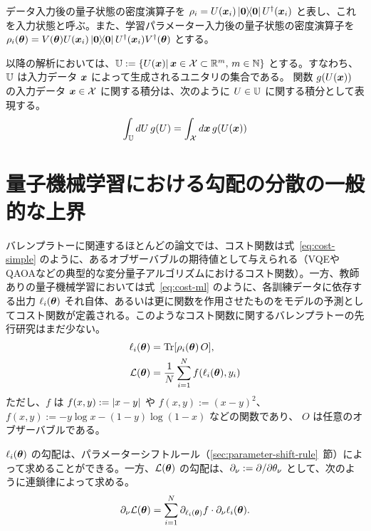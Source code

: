 データ入力後の量子状態の密度演算子を $\rho_i = U(\bs{x}_i)\dyad{\bs{0}}U\dg(\bs{x}_i)$ と表し、これを入力状態と呼ぶ。また、学習パラメーター入力後の量子状態の密度演算子を $\rho_i(\bs{\th}) = V(\bs{\th})U(\bs{x}_i)\dyad{\bs{0}}U\dg(\bs{x}_i)V\dg(\bs{\th})$ とする。

以降の解析においては、$\mathbb{U} := \{U(\boldsymbol{x})|\,\boldsymbol{x}\in \mathcal{X} \subset \mathbb{R}^m,\, m \in \mathbb{N}\}$ とする。すなわち、$\mathbb{U}$ は入力データ $\boldsymbol{x}$ によって生成されるユニタリの集合である。
関数 $g(U(\boldsymbol{x}))$ の入力データ $\boldsymbol{x}\in \mathcal{X}$ に関する積分は、次のように $U\in\mathbb{U}$ に関する積分として表現する。
\begin{align}
    \int_{\mathbb{U}} dU\,g(U) = \int_{\mathcal{X}} d\boldsymbol{x}\,g(U(\boldsymbol{x}))
\end{align}


\section{量子機械学習における勾配の分散の一般的な上界}\label{sec:qml-upper-var}
バレンプラトーに関連するほとんどの論文では、コスト関数は式~\eqref{eq:cost-simple} のように、あるオブザーバブルの期待値として与えられる（VQEやQAOAなどの典型的な変分量子アルゴリズムにおけるコスト関数）。一方、教師ありの量子機械学習においては式~\eqref{eq:cost-ml} のように、各訓練データに依存する出力 $\ell_i(\boldsymbol{\theta})$ それ自体、あるいは更に関数を作用させたものをモデルの予測としてコスト関数が定義される。このようなコスト関数に関するバレンプラトーの先行研究はまだ少ない。
\begin{align}
    \ell_i(\boldsymbol{\theta}) &= \Tr[\rho_i(\boldsymbol{\theta})\,O], \label{eq:cost-simple}\\
    \mathcal{L}(\boldsymbol{\theta}) &= \frac1N\sum_{i=1}^N f(\ell_i(\boldsymbol{\theta}),y_i) \label{eq:cost-ml}
\end{align}
ただし、$f$ は $f(x,y) := \abs{x - y}$ や $f(x,y) := (x-y)^2$、$f(x,y) := -y\log{x} - (1-y)\log{(1-x)}$ などの関数であり、
$O$ は任意のオブザーバブルである。

$\ell_i(\boldsymbol{\theta})$ の勾配は、パラメーターシフトルール（\ref{sec:parameter-shift-rule}~節）によって求めることができる。一方、$\mathcal{L}(\boldsymbol{\theta})$ の勾配は、$\partial_\nu := \partial/\partial\theta_\nu$  として、次のように連鎖律によって求める。
\begin{align}\label{eq:qml-chain-rule}
    \partial_\nu \mathcal{L}(\boldsymbol{\theta}) =  \sum_{i=1}^N \partial_{\ell_i(\boldsymbol{\theta})} f \cdot \partial_\nu \ell_i(\boldsymbol{\theta}).
\end{align}

